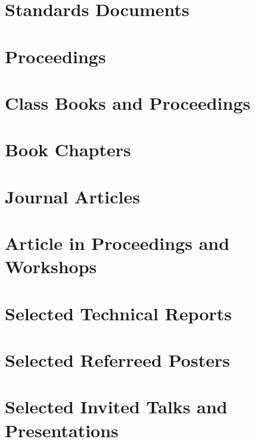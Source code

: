 \documentclass{article}
\begin{document}
\section{Standards Documents}


\section{Proceedings}


\section{Class Books and Proceedings}

\section{Book Chapters}

\section{Journal Articles}

\section{Article in Proceedings and Workshops}

\section{Selected Technical Reports}

\section{Selected Referreed Posters}


\section{Selected Invited Talks and Presentations} 
\end{document}
